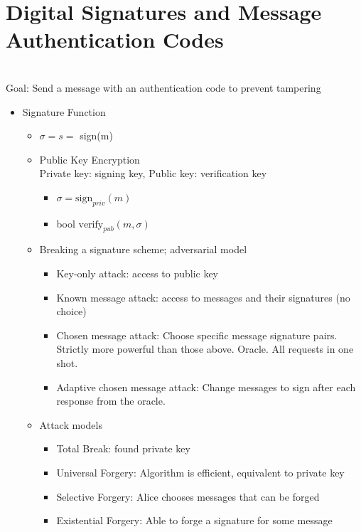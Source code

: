 \section{Digital Signatures and Message Authentication Codes}
\\Goal: Send a message with an authentication code to prevent tampering
\begin{itemize}
\item Signature Function
    \begin{itemize}
    \item $\sigma = s =$ sign(m)
    \item Public Key Encryption
    \\ Private key: signing key, Public key: verification key
        \begin{itemize}
        \item $\sigma = \text{sign}_{priv}(m)$
        \item bool $\text{verify}_{pub}(m, \sigma)$
        \end{itemize}
    \item Breaking a signature scheme; adversarial model
        \begin{itemize}
        \item Key-only attack: access to public key
        \item Known message attack: access to messages and their signatures (no choice)
        \item Chosen message attack: Choose specific message signature pairs. Strictly more powerful than those above. Oracle. All requests in one shot.
        \item Adaptive chosen message attack: Change messages to sign after each response from the oracle.
        \end{itemize}
    \item Attack models
        \begin{itemize}
        \item Total Break: found private key
        \item Universal Forgery: Algorithm is efficient, equivalent to private key
        \item Selective Forgery: Alice chooses messages that can be forged
        \item Existential Forgery: Able to forge a signature for some message
        \end{itemize}
    \end{itemize}
\end{itemize}